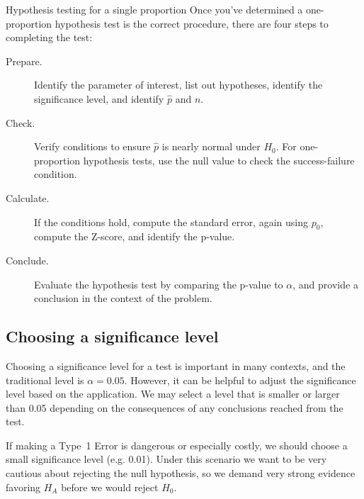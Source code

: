 
\newcommand{\oneprophtsummary}{
\begin{onebox}{Hypothesis testing for a single proportion}
  Once you've determined a one-proportion hypothesis test is the
  correct procedure, there are four steps to completing the
  test:
  \begin{description}
  \item[Prepare.]
      Identify the parameter of interest,
      list out hypotheses,
      identify the significance level,
      and identify $\hat{p}$ and $n$.
  \item[Check.]
      Verify conditions
      to ensure $\hat{p}$ is nearly normal under $H_0$.
      For one-proportion hypothesis tests, use the null
      value to check the success-failure condition.
  \item[Calculate.]
      If the conditions hold, compute the standard
      error, again using $p_0$, compute the Z-score,
      and identify the p-value.
  \item[Conclude.]
      Evaluate the hypothesis test by comparing the p-value
      to $\alpha$, and provide a conclusion in the context
      of the problem.
  \end{description}
\end{onebox}
}
\oneprophtsummary{}



\subsection{Choosing a significance level}
\label{significanceLevel}


Choosing a significance level for a test is important in
many contexts, and the traditional level is $\alpha = 0.05$.
However, it can be helpful to adjust the significance level
based on the application. We may select a level that is
smaller or larger than 0.05 depending on the consequences
of any conclusions reached from the test.

If making a Type~1 Error is dangerous or especially costly,
we should choose a small significance level (e.g. 0.01).
Under this scenario we want to be very cautious about
rejecting the null hypothesis, so we demand very strong
evidence favoring $H_A$ before we would reject $H_0$.

